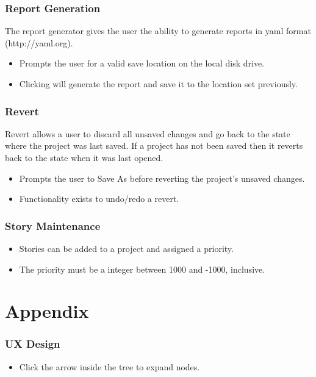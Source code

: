 \documentclass[11pt,fleqn]{book} %
\begin{document}
\subsection{Report Generation}
The report generator gives the user the ability to generate reports in yaml format (http://yaml.org).
\begin{itemize}
  \item {} Prompts the user for a valid save location on the local disk drive.
  \item Clicking  will generate the report and save it to the location set previously.
\end{itemize}

\subsection{Revert}
Revert allows a user to discard all unsaved changes and go back to the state where the project was last saved.
If a project has not been saved then it reverts back to the state when it was last opened.
\begin{itemize}
  \item {} Prompts the user to Save As before reverting the project's unsaved changes.
  \item Functionality exists to undo/redo a revert.
\end{itemize}

\subsection{Story Maintenance}
\begin{itemize}
  \item Stories can be added to a project and assigned a priority.
  \item The priority must be a integer between 1000 and -1000, inclusive.
\end{itemize}

\appendix
\chapter{Appendix}

\subsection{UX Design}
\begin{itemize}
\item Click the arrow inside the tree to expand nodes.
\end{itemize}
\end{document}
